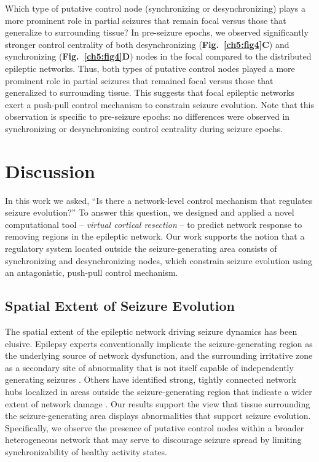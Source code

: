Which type of putative control node (synchronizing or desynchronizing) plays a more prominent role in partial seizures that remain focal versus those that generalize to surrounding tissue? In pre-seizure epochs, we observed significantly stronger control centrality of both desynchronizing (\textbf{Fig.~\ref{ch5:fig4}C}) and synchronizing (\textbf{Fig.~\ref{ch5:fig4}D}) nodes in the focal compared to the distributed epileptic networks. Thus, both types of putative control nodes played a more prominent role in partial seizures that remained focal versus those that generalized to surrounding tissue. This suggests that focal epileptic networks exert a push-pull control mechanism to constrain seizure evolution. Note that this observation is specific to pre-seizure epochs: no differences were observed in synchronizing or desynchronizing control centrality during seizure epochs.

\section{Discussion}

In this work we asked, ``Is there a network-level control mechanism that regulates seizure evolution?'' To answer this question, we designed and applied a novel computational tool -- \emph{virtual cortical resection} -- to predict network response to removing regions in the epileptic network. Our work supports the notion that a regulatory system located outside the seizure-generating area consists of synchronizing and desynchronizing nodes, which constrain seizure evolution using an antagonistic, push-pull control mechanism.

\subsection{Spatial Extent of Seizure Evolution}
The spatial extent of the epileptic network driving seizure dynamics has been elusive. Epilepsy experts conventionally implicate the seizure-generating region as the underlying source of network dysfunction, and the surrounding irritative zone as a secondary site of abnormality that is not itself capable of independently generating seizures \cite{rosenow2001presurgical, nair2004critical}. Others have identified strong, tightly connected network hubs localized in areas outside the seizure-generating region that indicate a wider extent of network damage \cite{schevon2007cortical, zaveri2009localization-related, rummel2013systems-level}. Our results support the view that tissue surrounding the seizure-generating area displays abnormalities that support seizure evolution. Specifically, we observe the presence of putative control nodes within a broader heterogeneous network that may serve to discourage seizure spread by limiting synchronizability of healthy activity states. 


